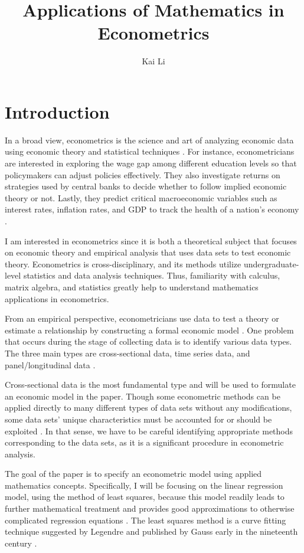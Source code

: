 \documentclass[final]{siamart1116}
\title{Applications of Mathematics in Econometrics}
\author{Kai Li}
\begin{document}
\maketitle

\section{Introduction}
\label{sec:intro}
In a broad view, econometrics is the science and art of analyzing economic data using economic theory and statistical techniques \cite{bk:stock_watson}. For instance, econometricians are interested in exploring the wage gap among different education levels so that policymakers can adjust policies effectively. They also investigate returns on strategies used by central banks to decide whether to follow implied economic theory or not. Lastly, they predict critical macroeconomic variables such as interest rates, inflation rates, and GDP to track the health of a nation's economy \cite{bk:wooldridge}.

I am interested in econometrics since it is both a theoretical subject that focuses on economic theory and empirical analysis that uses data sets to test economic theory. Econometrics is cross-disciplinary, and its methods utilize undergraduate-level statistics and data analysis techniques. Thus, familiarity with calculus, matrix algebra, and statistics greatly help to understand mathematics applications in econometrics. 

From an empirical perspective, econometricians use data to test a theory or estimate a relationship by constructing a formal economic model \cite{bk:wooldridge}. One problem that occurs during the stage of collecting data is to identify various data types. The three main types are cross-sectional data, time series data, and panel/longitudinal data \cite{bk:stock_watson}.

Cross-sectional data is the most fundamental type and will be used to formulate an economic model in the paper. Though some econometric methods can be applied directly to many different types of data sets without any modifications, some data sets' unique characteristics must be accounted for or should be exploited \cite{bk:wooldridge}. In that sense, we have to be careful identifying appropriate methods corresponding to the data sets, as it is a significant procedure in econometric analysis.

The goal of the paper is to specify an econometric model using applied mathematics concepts. Specifically, I will be focusing on the linear regression model, using the method of least squares, because this model readily leads to further mathematical treatment and provides good approximations to otherwise complicated regression equations \cite{bk:miller_miller}. The least squares method is a curve fitting technique suggested by Legendre \cite{bk:miller_miller} and published by Gauss early in the nineteenth century \cite{bk:tamhane_dunlop}. 
\end{document}
